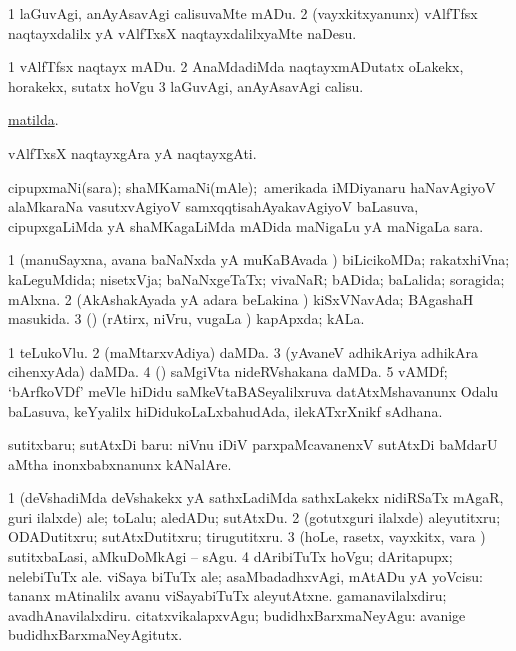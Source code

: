 \bentry
{} 
\gl{\sakirx}
\expl{}
\bmng
\bnum
\num{1} laGuvAgi, anAyAsavAgi calisuvaMte mADu. 
\num{2} (vayxkitxyanunx) vAlfTfsx naqtayxdalilx yA vAlfTxsX naqtayxdalilxyaMte naDesu. 
\enum
\emng

\noindent 
\gl{\akirx}
\expl{}
\bmng
\bnum
\num{1} vAlfTfsx naqtayx mADu. 
\num{2} AnaMdadiMda naqtayxmADutatx oLakekx, horakekx, sutatx hoVgu 
\num{3} laGuvAgi, anAyAsavAgi calisu. 
\enum
\emng

\noindent 
\gl{\pagu}
\expl{}
\bmng
{} \hyperref{kandict_m.pdf}{M}{Matilda}{matilda}. 
\emng
\eentry

\bentry
{} 
\gl{\nA}
\expl{}
\bmng
vAlfTxsX naqtayxgAra yA naqtayxgAti. 
\emng
\eentry

\bentry
{} 
\gl{\nA}
\expl{}
\bmng
cipupxmaNi(sara); shaMKamaNi(mAle);\kanu\ amerikada iMDiyanaru haNavAgiyoV alaMkaraNa vasutxvAgiyoV samxqqtisahAyakavAgiyoV baLasuva, cipupxgaLiMda yA shaMKagaLiMda mADida maNigaLu yA maNigaLa sara. 
\emng
\eentry

\bentry
{} 
\gl{\gu}
\expl{}
\bmng
\bnum
\num{1} (manuSayxna, avana baNaNxda yA muKaBAvada \vi) biLicikoMDa; rakatxhiVna; kaLeguMdida; nisetxVja; baNaNxgeTaTx; vivaNaR; bADida; baLalida; soragida; mAlxna. 
\num{2} (AkAshakAyada yA adara beLakina \vi) kiSxVNavAda; BAgashaH masukida. 
\num{3} (\pArxparx) (rAtirx, niVru, \mo vugaLa \vi) kapApxda; kALa. 
\enum
\emng
\eentry

\bentry
{} 
\gl{\nA}
\expl{}
\bmng
\bnum
\num{1} teLukoVlu. 
\num{2} (maMtarxvAdiya) daMDa. 
\num{3} (yAvaneV adhikAriya adhikAra cihenxyAda) daMDa. 
\num{4} (\AmA) saMgiVta nideRVshakana daMDa. 
\num{5} vAMDf; `bArfkoVDf' meVle hiDidu saMkeVtaBASeyalilxruva  datAtxMshavanunx Odalu baLasuva, keYyalilx hiDidukoLaLxbahudAda, ilekATxrXnikf sAdhana. 
\enum
\emng
\eentry

\bentry
{} 
\gl{\sakirx}
\expl{}
\bmng
sutitxbaru; sutAtxDi baru:  niVnu iDiV parxpaMcavanenxV sutAtxDi baMdarU aMtha inonxbabxnanunx kANalAre. 
\emng

\noindent 
\gl{\akirx}
\expl{}
\bmng
\bnum
\num{1} (deVshadiMda deVshakekx yA sathxLadiMda sathxLakekx nidiRSaTx mAgaR, guri ilalxde) ale; toLalu; aledADu; sutAtxDu. 
\num{2} (gotutxguri ilalxde) aleyutitxru; ODADutitxru; sutAtxDutitxru; tirugutitxru. 
\num{3} (hoLe, rasetx, vayxkitx, \mo vara \vi) sutitxbaLasi, aMkuDoMkAgi -- sAgu. 
\num{4} dAribiTuTx hoVgu; dAritapupx; nelebiTuTx ale. 
\banum
{} viSaya biTuTx ale; asaMbadadhxvAgi, mAtADu yA yoVcisu:  tananx mAtinalilx avanu viSayabiTuTx aleyutAtxne. 
 gamanavilalxdiru; avadhAnavilalxdiru. 
 citatxvikalapxvAgu; budidhxBarxmaNeyAgu:  avanige budidhxBarxmaNeyAgitutx. 
\eanum
\numie
\enum
\emng
\eentry

